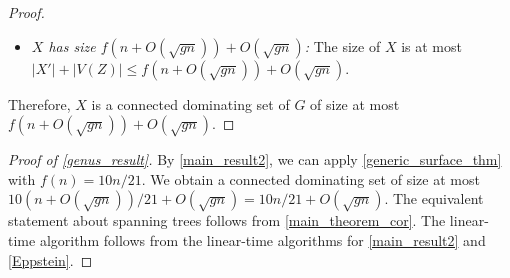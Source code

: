 \begin{proof}
\begin{itemize}
    \item \emph{$X$ has size $f(n + O(\sqrt{gn}))+O(\sqrt{gn})$:} The size of $X$ is at most $|X'| + |V(Z)|\le f(n + O(\sqrt{gn})) + O(\sqrt{gn})$.
\end{itemize}
Therefore, $X$ is a connected dominating set of $G$ of size at most $f(n+O(\sqrt{gn}))+ O(\sqrt{gn})$.
\end{proof}

\begin{proof}[Proof of \cref{genus_result}]
    By \cref{main_result2}, we can apply \cref{generic_surface_thm} with $f(n)= 10n/21$. We obtain a connected dominating set of size at most $10 (n + O(\sqrt{gn}))/21 + O(\sqrt{gn}) = 10n/21 + O(\sqrt{gn})$.  The equivalent statement about spanning trees follows from \cref{main_theorem_cor}.  The linear-time algorithm follows from the linear-time algorithms for \cref{main_result2} and \cref{Eppstein}.
\end{proof}



